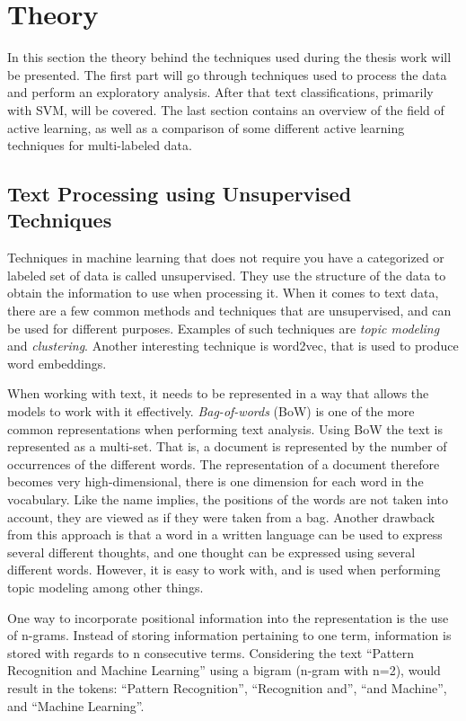 \chapter{Theory}
\label{cha:theory}

In this section the theory behind the techniques used during the thesis work will be presented.
The first part will go through techniques used to process the data and perform an exploratory analysis.
After that text classifications, primarily with SVM, will be covered.
The last section contains an overview of the field of active learning, as well as a comparison of some different active learning techniques for multi-labeled data.

\section{Text Processing using Unsupervised Techniques}

Techniques in machine learning that does not require you have a categorized or labeled set of data is called unsupervised.
They use the structure of the data to obtain the information to use when processing it.
When it comes to text data, there are a few common methods and techniques that are unsupervised, and can be used for different purposes.
Examples of such techniques are \textit{topic modeling} and \textit{clustering}.
Another interesting technique is word2vec, that is used to produce word embeddings.

When working with text, it needs to be represented in a way that allows the models to work with it effectively.
\textit{Bag-of-words} (BoW) is one of the more common representations when performing text analysis. 
Using BoW the text is represented as a multi-set. 
That is, a document is represented by the number of occurrences of the different words. 
The representation of a document therefore becomes very high-dimensional, there is one dimension for each word in the vocabulary. 
Like the name implies, the positions of the words are not taken into account, they are viewed as if they were taken from a bag. 
Another drawback from this approach is that a word in a written language can be used to express several different thoughts, and one thought can be expressed using several different words. 
However, it is easy to work with, and is used when performing topic modeling among other things.

One way to incorporate positional information into the representation is the use of n-grams.
Instead of storing information pertaining to one term, information is stored with regards to n consecutive terms.
Considering the text ``Pattern Recognition and Machine Learning'' using a bigram (n-gram with n=2), would result in the tokens: ``Pattern Recognition'', ``Recognition and'', ``and Machine'', and ``Machine Learning''.

